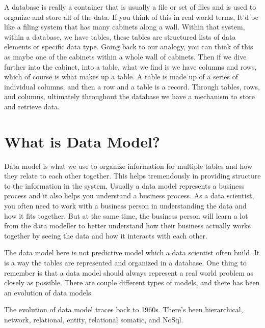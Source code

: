 \documentclass[]{book}
\theoremstyle{definition}
\theoremstyle{definition}
\theoremstyle{remark}
\begin{document}
A database is really a container that is usually a file or set of files
and is used to organize and store all of the data. If you think of this
in real world terms, It'd be like a filing system that has many cabinets
along a wall. Within that system, within a database, we have tables,
these tables are structured lists of data elements or specific data
type. Going back to our analogy, you can think of this as maybe one of
the cabinets within a whole wall of cabinets. Then if we dive further
into the cabinet, into a table, what we find is we have columns and
rows, which of course is what makes up a table. A table is made up of a
series of individual columns, and then a row and a table is a record.
Through tables, rows, and columns, ultimately throughout the database we
have a mechanism to store and retrieve data.

\section{What is Data Model?}\label{what-is-data-model}

Data model is what we use to organize information for multiple tables
and how they relate to each other together. This helps tremendously in
providing structure to the information in the system. Usually a data
model represents a business process and it also helps you understand a
business process. As a data scientist, you often need to work with a
business person in understanding the data and how it fits together. But
at the same time, the business person will learn a lot from the data
modeller to better understand how their business actually works together
by seeing the data and how it interacts with each other.

The data model here is not predictive model which a data scientist often
build. It is a way the tables are represented and organized in a
database. One thing to remember is that a data model should always
represent a real world problem as closely as possible. There are couple
different types of models, and there has been an evolution of data
models.

The evolution of data model traces back to 1960s. There's been
hierarchical, network, relational, entity, relational somatic, and
NoSql.
\end{document}

